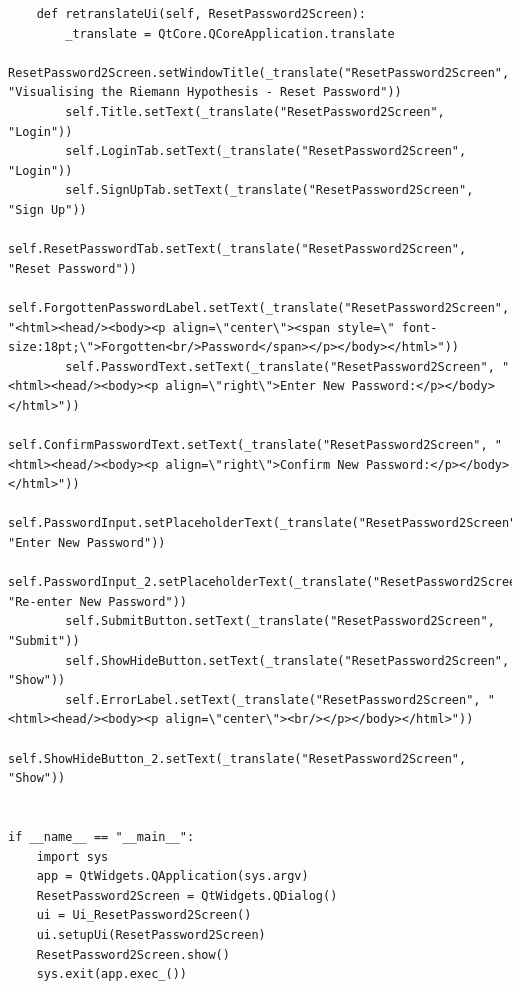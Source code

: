 \documentclass[12pt]{article}
\begin{document}
\begin{lstlisting}
    def retranslateUi(self, ResetPassword2Screen):
        _translate = QtCore.QCoreApplication.translate
        ResetPassword2Screen.setWindowTitle(_translate("ResetPassword2Screen", "Visualising the Riemann Hypothesis - Reset Password"))
        self.Title.setText(_translate("ResetPassword2Screen", "Login"))
        self.LoginTab.setText(_translate("ResetPassword2Screen", "Login"))
        self.SignUpTab.setText(_translate("ResetPassword2Screen", "Sign Up"))
        self.ResetPasswordTab.setText(_translate("ResetPassword2Screen", "Reset Password"))
        self.ForgottenPasswordLabel.setText(_translate("ResetPassword2Screen", "<html><head/><body><p align=\"center\"><span style=\" font-size:18pt;\">Forgotten<br/>Password</span></p></body></html>"))
        self.PasswordText.setText(_translate("ResetPassword2Screen", "<html><head/><body><p align=\"right\">Enter New Password:</p></body></html>"))
        self.ConfirmPasswordText.setText(_translate("ResetPassword2Screen", "<html><head/><body><p align=\"right\">Confirm New Password:</p></body></html>"))
        self.PasswordInput.setPlaceholderText(_translate("ResetPassword2Screen", "Enter New Password"))
        self.PasswordInput_2.setPlaceholderText(_translate("ResetPassword2Screen", "Re-enter New Password"))
        self.SubmitButton.setText(_translate("ResetPassword2Screen", "Submit"))
        self.ShowHideButton.setText(_translate("ResetPassword2Screen", "Show"))
        self.ErrorLabel.setText(_translate("ResetPassword2Screen", "<html><head/><body><p align=\"center\"><br/></p></body></html>"))
        self.ShowHideButton_2.setText(_translate("ResetPassword2Screen", "Show"))


if __name__ == "__main__":
    import sys
    app = QtWidgets.QApplication(sys.argv)
    ResetPassword2Screen = QtWidgets.QDialog()
    ui = Ui_ResetPassword2Screen()
    ui.setupUi(ResetPassword2Screen)
    ResetPassword2Screen.show()
    sys.exit(app.exec_())
\end{lstlisting}
\end{document}
